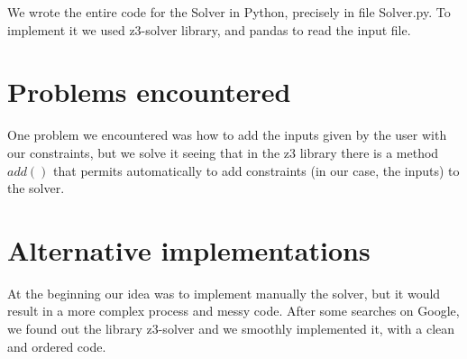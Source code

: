 \documentclass[12pt]{article}
\begin{document}
We wrote the entire code for the Solver in Python, precisely in file Solver.py. To implement it we used z3-solver library, and pandas to read the input file. 
\newpage
\section{Problems encountered}
One problem we encountered was how to add the inputs given by the user with our constraints, but we solve it seeing that in the z3 library there is a method ${add()}$ that permits
automatically to add constraints (in our case, the inputs) to the solver.
\section{Alternative implementations}
At the beginning our idea was to implement manually the solver, but it would result in a more complex process and messy code.
After some searches on Google, we found out the library z3-solver and we smoothly implemented it, with a clean and ordered code.
\end{document}

